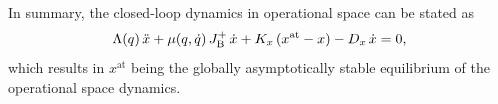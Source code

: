\documentclass[letterpaper, 10pt, conference]{ieeeconf}      %
\begin{document}

In summary, the closed-loop dynamics in operational space can be stated as
\begin{equation}\label{eq:braincontrol:closed_loop_dynamics}
    \Lambda(q) \, \Ddot{x} + \mu(q,\dot{q}) \, J_\mathrm{B}^+ \, \dot{x} + K_x \, (x^\mathrm{at} - x) - D_x \, \dot{x} = 0,
\end{equation}
which results in $x^\mathrm{at}$ being the globally asymptotically stable equilibrium of the operational space dynamics.

\end{document}
